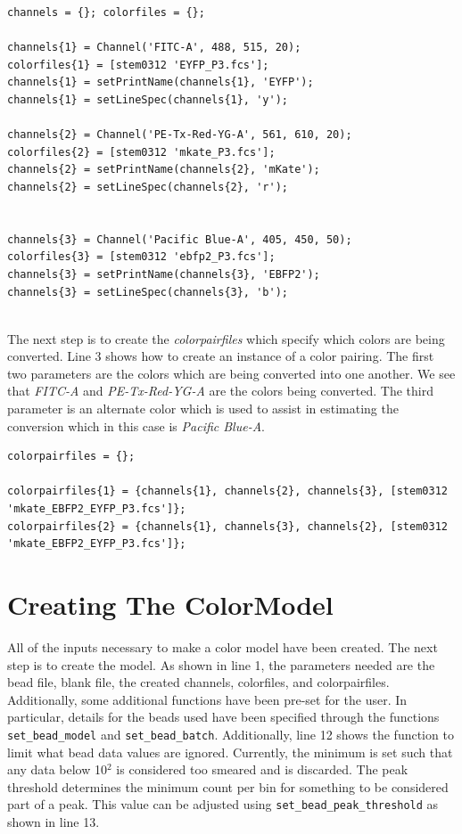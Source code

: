 \begin{minipage}{0.95\textwidth} 
\begin{lstlisting}
channels = {}; colorfiles = {};

channels{1} = Channel('FITC-A', 488, 515, 20);
colorfiles{1} = [stem0312 'EYFP_P3.fcs'];
channels{1} = setPrintName(channels{1}, 'EYFP'); 
channels{1} = setLineSpec(channels{1}, 'y'); 

channels{2} = Channel('PE-Tx-Red-YG-A', 561, 610, 20);
colorfiles{2} = [stem0312 'mkate_P3.fcs'];
channels{2} = setPrintName(channels{2}, 'mKate');
channels{2} = setLineSpec(channels{2}, 'r');


channels{3} = Channel('Pacific Blue-A', 405, 450, 50);
colorfiles{3} = [stem0312 'ebfp2_P3.fcs'];
channels{3} = setPrintName(channels{3}, 'EBFP2');
channels{3} = setLineSpec(channels{3}, 'b');


\end{lstlisting}
\end{minipage}

The next step is to create the \textit{colorpairfiles} which specify which colors are being converted. Line 3 shows how to create an instance of a color pairing. The first two parameters are the colors which are being converted into one another. We see that \textit{FITC-A} and \textit{PE-Tx-Red-YG-A} are the colors being converted. The third parameter is an alternate color which is used to assist in estimating the conversion which in this case is \textit{Pacific Blue-A}. 

\begin{minipage}{0.95\textwidth} 
\begin{lstlisting}
colorpairfiles = {};

colorpairfiles{1} = {channels{1}, channels{2}, channels{3}, [stem0312 'mkate_EBFP2_EYFP_P3.fcs']};
colorpairfiles{2} = {channels{1}, channels{3}, channels{2}, [stem0312 'mkate_EBFP2_EYFP_P3.fcs']};

\end{lstlisting}
\end{minipage}


\section*{Creating The ColorModel}

All of the inputs necessary to make a color model have been created. The next step is to create the model. As shown in line 1, the parameters needed are the bead file, blank file, the created channels, colorfiles, and colorpairfiles. Additionally, some additional functions have been pre-set for the user. In particular, details for the beads used have been specified through the functions \lstinline+set_bead_model+ and \lstinline+set_bead_batch+. Additionally, line 12 shows the function to limit what bead data values are ignored. Currently, the minimum is set such that any data below 10$^2$ is considered too smeared and is discarded. The peak threshold determines the minimum count per bin for something to be considered part of a peak. This value can be adjusted using \lstinline+set_bead_peak_threshold+ as shown in line 13. 


